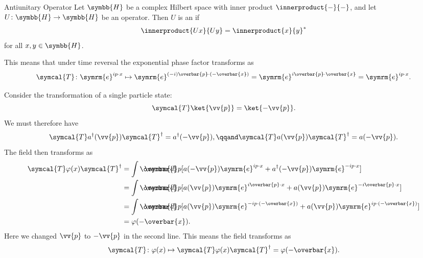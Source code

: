 \documentclass[fleqn]{NotesClass}
\newcommand{\e}{\symrm{e}}
\newcommand{\timeReversal}{\symcal{T}}
\newcommand{\hermit}{{\dagger}}
\newcommand\dbar{\ThisStyle{\ensurestackMath{%
            \stackengine{-.3\LMpt}{\SavedStyle \symrm{d}}{\SavedStyle\overbar{}%
                \mkern2.25mu}{O}{r}{F}{F}{L}}}}
\newcommand{\invariantmeasure}[1]{\dbar #1}
\newcommand{\hilbertSpace}{\symbb{H}}
\begin{document}
    \begin{dfn}{Antiunitary Operator}{}
        Let \(\hilbertSpace\) be a complex Hilbert space with inner product \(\innerproduct{-}{-}\), and let \(U \colon \hilbertSpace \to \hilbertSpace\) be an operator.
        Then \(U\) is an  if
        \begin{equation}
            \innerproduct{Ux}{Uy} = \innerproduct{x}{y}^*
        \end{equation}
        for all \(x, y \in \hilbertSpace\).
    \end{dfn}
    
    This means that under time reversal the exponential phase factor transforms as
    \begin{equation}
        \timeReversal \colon \e^{ip\cdot x} \mapsto \e^{(-i)\overbar{p} \cdot (-\overbar{x})} = \e^{i\overbar{p}\cdot\overbar{x}} = \e^{ip \cdot x}.
    \end{equation}
    
    Consider the transformation of a single particle state:
    \begin{equation}
        \timeReversal\ket{\vv{p}} = \ket{-\vv{p}}.
    \end{equation}
    We must therefore have
    \begin{equation}
        \timeReversal a^\hermit(\vv{p}) \timeReversal^\hermit = a^\hermit(-\vv{p}), \qqand \timeReversal a(\vv{p}) \timeReversal^\hermit = a(-\vv{p}).
    \end{equation}
    The field then transforms as
    \begin{align}
        \timeReversal \varphi(x) \timeReversal^\hermit &= \int \invariantmeasure{p} [a(-\vv{p}) \e^{ip\cdot x} + a^\hermit(-\vv{p}) \e^{-ip\cdot x}]\\
        &= \int \invariantmeasure{p} [a(\vv{p}) \e^{i\overbar{p} \cdot x} + a(\vv{p})\e^{-i\overbar{p}\cdot x}]\\
        &= \int \invariantmeasure{p} [a(\vv{p}) \e^{-ip\cdot (-\overbar{x})} + a(\vv{p})\e^{ip \cdot (-\overbar{x})}]\\
        &= \varphi(-\overbar{x}).
    \end{align}
    Here we changed \(\vv{p}\) to \(-\vv{p}\) in the second line.
    This means the field transforms as
    \begin{equation}
        \timeReversal \colon \varphi(x) \mapsto \timeReversal \varphi(x) \timeReversal^\hermit = \varphi(-\overbar{x}).
    \end{equation}
    
\end{document}

